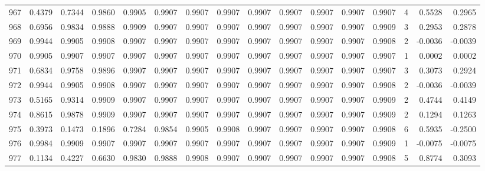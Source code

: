 \begin{tabular}{lrrrrrrrrrrrrrrr}
967 &      0.4379 &  0.7344 &  0.9860 &  0.9905 &  0.9907 &  0.9907 &  0.9907 &  0.9907 &  0.9907 &  0.9907 &   0.9907 &     0.9907 &      4 &                    0.5528 &                     0.2965 \\
968 &      0.6956 &  0.9834 &  0.9888 &  0.9909 &  0.9907 &  0.9907 &  0.9907 &  0.9907 &  0.9907 &  0.9907 &   0.9907 &     0.9909 &      3 &                    0.2953 &                     0.2878 \\
969 &      0.9944 &  0.9905 &  0.9908 &  0.9907 &  0.9907 &  0.9907 &  0.9907 &  0.9907 &  0.9907 &  0.9907 &   0.9907 &     0.9908 &      2 &                   -0.0036 &                    -0.0039 \\
970 &      0.9905 &  0.9907 &  0.9907 &  0.9907 &  0.9907 &  0.9907 &  0.9907 &  0.9907 &  0.9907 &  0.9907 &   0.9907 &     0.9907 &      1 &                    0.0002 &                     0.0002 \\
971 &      0.6834 &  0.9758 &  0.9896 &  0.9907 &  0.9907 &  0.9907 &  0.9907 &  0.9907 &  0.9907 &  0.9907 &   0.9907 &     0.9907 &      3 &                    0.3073 &                     0.2924 \\
972 &      0.9944 &  0.9905 &  0.9908 &  0.9907 &  0.9907 &  0.9907 &  0.9907 &  0.9907 &  0.9907 &  0.9907 &   0.9907 &     0.9908 &      2 &                   -0.0036 &                    -0.0039 \\
973 &      0.5165 &  0.9314 &  0.9909 &  0.9907 &  0.9907 &  0.9907 &  0.9907 &  0.9907 &  0.9907 &  0.9907 &   0.9907 &     0.9909 &      2 &                    0.4744 &                     0.4149 \\
974 &      0.8615 &  0.9878 &  0.9909 &  0.9907 &  0.9907 &  0.9907 &  0.9907 &  0.9907 &  0.9907 &  0.9907 &   0.9907 &     0.9909 &      2 &                    0.1294 &                     0.1263 \\
975 &      0.3973 &  0.1473 &  0.1896 &  0.7284 &  0.9854 &  0.9905 &  0.9908 &  0.9907 &  0.9907 &  0.9907 &   0.9907 &     0.9908 &      6 &                    0.5935 &                    -0.2500 \\
976 &      0.9984 &  0.9909 &  0.9907 &  0.9907 &  0.9907 &  0.9907 &  0.9907 &  0.9907 &  0.9907 &  0.9907 &   0.9907 &     0.9909 &      1 &                   -0.0075 &                    -0.0075 \\
977 &      0.1134 &  0.4227 &  0.6630 &  0.9830 &  0.9888 &  0.9908 &  0.9907 &  0.9907 &  0.9907 &  0.9907 &   0.9907 &     0.9908 &      5 &                    0.8774 &                     0.3093 \\

\end{tabular}
